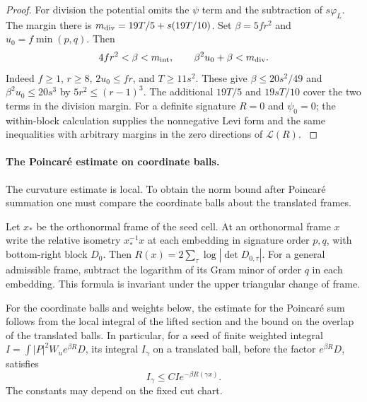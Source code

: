 \begin{proof}
For division the potential
omits the \(\psi\) term and the subtraction of
\(s\varphi_L\). The margin there is
\(m_{\rm div}=19T/5+s(19T/10)\).
Set \(\beta=5fr^2\) and \(u_0=f\min(p,q)\). Then
\[
 4fr^2<\beta<m_{\rm int},
 \qquad \beta^2 u_0+\beta < m_{\rm div}.
\]
Indeed \(f\ge1\), \(r\ge8\), \(2u_0\le fr\), and
\(T\ge11s^2\). These give
\(\beta\le20s^2/49\) and
\(\beta^2 u_0\le20s^3\) by \(5r^2\le(r-1)^3\).
The additional \(19T/5\) and \(19sT/10\) cover the
two terms in the division margin. For a definite
signature \(R=0\) and \(\psi_0=0\); the within-block
calculation supplies the nonnegative Levi form and the
same inequalities with arbitrary margins in the zero
directions of \(\mathcal L(R)\).
\label{cor:slice-short-analytic-2}

\end{proof}

\paragraph{The Poincar\'e estimate on coordinate balls.}

The curvature estimate is local. To obtain the norm bound after Poincar\'e summation one must compare the coordinate balls about the translated frames.

Let \(x_*\) be the orthonormal frame of the seed cell.
At an orthonormal frame \(x\) write the relative
isometry \(x_*^{-1}x\) at each embedding in signature
order \(p,q\), with bottom-right block \(D_0\).
Then \(R(x)=2\sum_\tau\log |\det D_{0,\tau}|\).
For a general admissible frame, subtract the logarithm
of its Gram minor of order \(q\) in each embedding.
This formula is invariant under the upper triangular
change of frame.

\begin{lemma}
\label{lem:short-poincare-summation}
For the coordinate balls and weights below, the estimate for the
Poincaré sum follows from the local integral of the lifted section
and the bound on the overlap of the translated balls. In particular, for a seed of finite weighted integral \(I=\int|P|^2W_u e^{\beta R}D\), its integral \(I_\gamma\) on a translated ball, before the factor \(e^{\beta R}D\), satisfies
\[
 I_\gamma\le C I e^{-\beta R(\gamma x)}.
\]
The constants may depend on the fixed cut chart.
\end{lemma}

